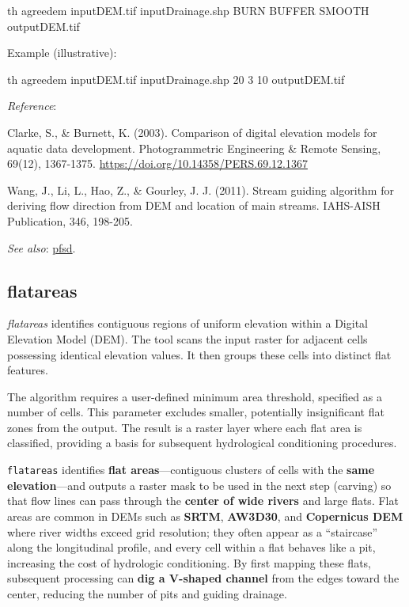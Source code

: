 \documentclass[
]{book}
\newenvironment{Shaded}{\begin{snugshade}}{\end{snugshade}}
\newcommand{\ExtensionTok}[1]{#1}
\newcommand{\NormalTok}[1]{#1}
\theoremstyle{definition}
\theoremstyle{definition}
\theoremstyle{definition}
\theoremstyle{definition}
\theoremstyle{remark}
\begin{document}
\begin{Shaded}
\begin{Highlighting}[]
\ExtensionTok{th}\NormalTok{ agreedem inputDEM.tif inputDrainage.shp BURN BUFFER SMOOTH outputDEM.tif}
\end{Highlighting}
\end{Shaded}

Example (illustrative):

\begin{Shaded}
\begin{Highlighting}[]
\ExtensionTok{th}\NormalTok{ agreedem inputDEM.tif inputDrainage.shp 20 3 10 outputDEM.tif}
\end{Highlighting}
\end{Shaded}

\emph{Reference}:

Clarke, S., \& Burnett, K. (2003). Comparison of digital elevation models for aquatic data development. Photogrammetric Engineering \& Remote Sensing, 69(12), 1367-1375. \url{https://doi.org/10.14358/PERS.69.12.1367}

Wang, J., Li, L., Hao, Z., \& Gourley, J. J. (2011). Stream guiding algorithm for deriving flow direction from DEM and location of main streams. IAHS-AISH Publication, 346, 198-205.

\emph{See also}: \hyperref[pfsd]{pfsd}.

\subsection{flatareas}\label{flatareas}

\emph{flatareas} identifies contiguous regions of uniform elevation within a Digital Elevation Model (DEM). The tool scans the input raster for adjacent cells possessing identical elevation values. It then groups these cells into distinct flat features.

The algorithm requires a user-defined minimum area threshold, specified as a number of cells. This parameter excludes smaller, potentially insignificant flat zones from the output. The result is a raster layer where each flat area is classified, providing a basis for subsequent hydrological conditioning procedures.

\texttt{flatareas} identifies \textbf{flat areas}---contiguous clusters of cells with the \textbf{same elevation}---and outputs a raster mask to be used in the next step (carving) so that flow lines can pass through the \textbf{center of wide rivers} and large flats. Flat areas are common in DEMs such as \textbf{SRTM}, \textbf{AW3D30}, and \textbf{Copernicus DEM} where river widths exceed grid resolution; they often appear as a ``staircase'' along the longitudinal profile, and every cell within a flat behaves like a pit, increasing the cost of hydrologic conditioning. By first mapping these flats, subsequent processing can \textbf{dig a V-shaped channel} from the edges toward the center, reducing the number of pits and guiding drainage.
\end{document}
